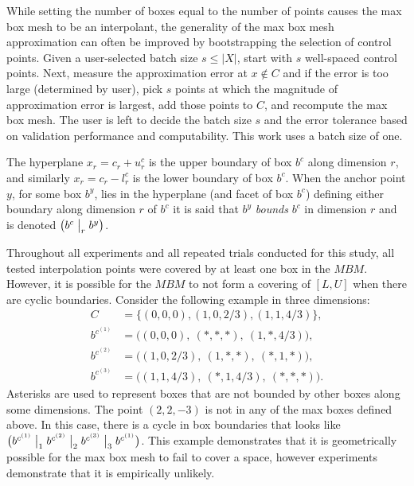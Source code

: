 While setting the number of boxes equal to the number of points causes the max box mesh to be an interpolant, the generality of the max box mesh approximation can often be improved by bootstrapping the selection of control points. Given a user-selected batch size $s \leq |X|$, start with $s$ well-spaced control points. Next, measure the approximation error at $x \notin C$ and if the error is too large (determined by user), pick $s$ points at which the magnitude of approximation error is largest, add those points to $C$, and recompute the max box mesh. The user is left to decide the batch size $s$ and the error tolerance based on validation performance and computability. This work uses a batch size of one.

\begin{definition}
The hyperplane $x_r = c_r + u^c_r$ is the upper boundary of box $b^c$ along dimension $r$, and similarly $x_r = c_r - l^c_r$ is the lower boundary of box $b^c$. When the anchor point $y$, for some box $b^y$, lies in the hyperplane (and facet of box $b^c$) defining either boundary along dimension $r$ of $b^c$ it is said that $b^y$ \textit{bounds} $b^c$ in dimension $r$ and is denoted $\bigl( b^c \bigm\vert_r b^y \bigr)$.
\end{definition}

Throughout all experiments and all repeated trials conducted for this study, all tested interpolation points were covered by at least one box in the $MBM$. However, it is possible for the $MBM$ to not form a covering of $[L,U]$ when there are cyclic boundaries. Consider the following example in three dimensions:
\begin{align*}
  C         &= \bigl\{(0,0,0), (1,0,2/3), (1,1,4/3)\bigr\}, \\
  b^{c^{(1)}} &= \bigl( (0,0,0),  \ (*,*,*),  \ (1,*,4/3) \bigr), \\
  b^{c^{(2)}} &= \bigl( (1,0,2/3),\ (1,*,*),  \ (*,1,*)   \bigr), \\
  b^{c^{(3)}} &= \bigl( (1,1,4/3),\ (*,1,4/3),\ (*,*,*)   \bigr).
\end{align*}
Asterisks are used to represent boxes that are not bounded by other boxes along some dimensions. The point $(2,2,-3)$ is not in any of the max boxes defined above. In this case, there is a cycle in box boundaries that looks like $\bigl( b^{c^{(1)}} \bigm\vert_1 b^{c^{(2)}} \bigm\vert_2 b^{c^{(3)}} \bigm\vert_3 b^{c^{(1)}} \bigr)$. This example demonstrates that it is geometrically possible for the max box mesh to fail to cover a space, however experiments demonstrate that it is empirically unlikely.


